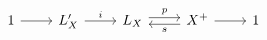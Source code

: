 \[
\begin{tikzcd}[column sep=2.3em]
 1 \arrow[r]
 & L'_X \arrow[r,"i"]
 & L_X
     \arrow[r,shift left=0.55ex,"p"]
 & X^+
     \arrow[l,shift left=0.55ex,"s"]
     \arrow[r]
 & 1
\end{tikzcd}
\]
